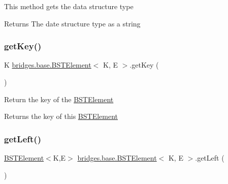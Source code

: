 This method gets the data structure type

\begin{DoxyReturn}{Returns}
The date structure type as a string 
\end{DoxyReturn}
\hypertarget{classbridges_1_1base_1_1_b_s_t_element_afba950fad36d3327b01003df3ba4cc9f}{}\label{classbridges_1_1base_1_1_b_s_t_element_afba950fad36d3327b01003df3ba4cc9f} 
\subsubsection{\texorpdfstring{get\+Key()}{getKey()}}
{\footnotesize\ttfamily K \hyperlink{classbridges_1_1base_1_1_b_s_t_element}{bridges.\+base.\+B\+S\+T\+Element}$<$ K, E $>$.get\+Key (\begin{DoxyParamCaption}{ }\end{DoxyParamCaption})}

Return the key of the \hyperlink{classbridges_1_1base_1_1_b_s_t_element}{B\+S\+T\+Element}

\begin{DoxyReturn}{Returns}
the key of this \hyperlink{classbridges_1_1base_1_1_b_s_t_element}{B\+S\+T\+Element} 
\end{DoxyReturn}
\hypertarget{classbridges_1_1base_1_1_b_s_t_element_af08f59c0148a8bd04de675938018b76e}{}\label{classbridges_1_1base_1_1_b_s_t_element_af08f59c0148a8bd04de675938018b76e} 
\subsubsection{\texorpdfstring{get\+Left()}{getLeft()}}
{\footnotesize\ttfamily \hyperlink{classbridges_1_1base_1_1_b_s_t_element}{B\+S\+T\+Element}$<$K,E$>$ \hyperlink{classbridges_1_1base_1_1_b_s_t_element}{bridges.\+base.\+B\+S\+T\+Element}$<$ K, E $>$.get\+Left (\begin{DoxyParamCaption}{ }\end{DoxyParamCaption})}

\hypertarget{classbridges_1_1base_1_1_b_s_t_element_ad419116db8b4e6d70785d07953853e02}{}\label{classbridges_1_1base_1_1_b_s_t_element_ad419116db8b4e6d70785d07953853e02} 
